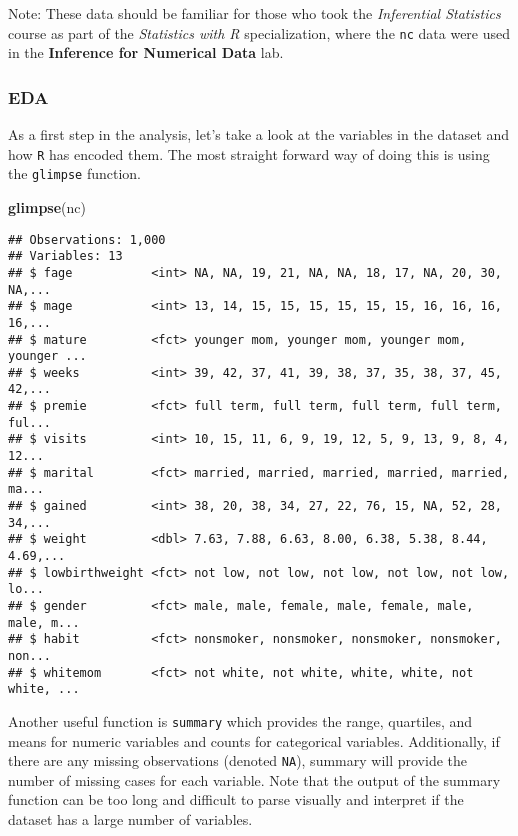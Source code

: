 \documentclass[]{article}
\newenvironment{Shaded}{\begin{snugshade}}{\end{snugshade}}
\newcommand{\KeywordTok}[1]{\textcolor[rgb]{0.13,0.29,0.53}{\textbf{#1}}}
\newcommand{\NormalTok}[1]{#1}
\begin{document}
Note: These data should be familiar for those who took the
\emph{Inferential Statistics} course as part of the \emph{Statistics
with R} specialization, where the \texttt{nc} data were used in the
\textbf{Inference for Numerical Data} lab.

\subsubsection{EDA}\label{eda}

As a first step in the analysis, let's take a look at the variables in
the dataset and how \texttt{R} has encoded them. The most straight
forward way of doing this is using the \texttt{glimpse} function.

\begin{Shaded}
\begin{Highlighting}[]
\KeywordTok{glimpse}\NormalTok{(nc)}
\end{Highlighting}
\end{Shaded}

\begin{verbatim}
## Observations: 1,000
## Variables: 13
## $ fage           <int> NA, NA, 19, 21, NA, NA, 18, 17, NA, 20, 30, NA,...
## $ mage           <int> 13, 14, 15, 15, 15, 15, 15, 15, 16, 16, 16, 16,...
## $ mature         <fct> younger mom, younger mom, younger mom, younger ...
## $ weeks          <int> 39, 42, 37, 41, 39, 38, 37, 35, 38, 37, 45, 42,...
## $ premie         <fct> full term, full term, full term, full term, ful...
## $ visits         <int> 10, 15, 11, 6, 9, 19, 12, 5, 9, 13, 9, 8, 4, 12...
## $ marital        <fct> married, married, married, married, married, ma...
## $ gained         <int> 38, 20, 38, 34, 27, 22, 76, 15, NA, 52, 28, 34,...
## $ weight         <dbl> 7.63, 7.88, 6.63, 8.00, 6.38, 5.38, 8.44, 4.69,...
## $ lowbirthweight <fct> not low, not low, not low, not low, not low, lo...
## $ gender         <fct> male, male, female, male, female, male, male, m...
## $ habit          <fct> nonsmoker, nonsmoker, nonsmoker, nonsmoker, non...
## $ whitemom       <fct> not white, not white, white, white, not white, ...
\end{verbatim}

Another useful function is \texttt{summary} which provides the range,
quartiles, and means for numeric variables and counts for categorical
variables. Additionally, if there are any missing observations (denoted
\texttt{NA}), summary will provide the number of missing cases for each
variable. Note that the output of the summary function can be too long
and difficult to parse visually and interpret if the dataset has a large
number of variables.
\end{document}
